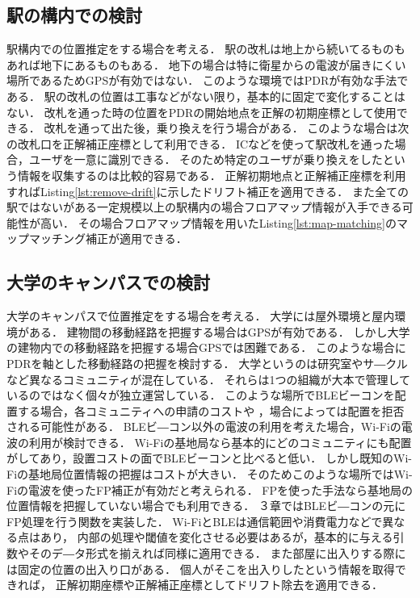 \subsection{駅の構内での検討}
駅構内での位置推定をする場合を考える．
駅の改札は地上から続いてるものもあれば地下にあるものもある．
地下の場合は特に衛星からの電波が届きにくい場所であるためGPSが有効ではない．
このような環境ではPDRが有効な手法である．
駅の改札の位置は工事などがない限り，基本的に固定で変化することはない．
改札を通った時の位置をPDRの開始地点を正解の初期座標として使用できる．
改札を通って出た後，乗り換えを行う場合がある．
このような場合は次の改札口を正解補正座標として利用できる．
ICなどを使って駅改札を通った場合，ユーザを一意に識別できる．
そのため特定のユーザが乗り換えをしたという情報を収集するのは比較的容易である．
正解初期地点と正解補正座標を利用すればListing\ref{lst:remove-drift}に示したドリフト補正を適用できる．
また全ての駅ではないがある一定規模以上の駅構内の場合フロアマップ情報が入手できる可能性が高い．
その場合フロアマップ情報を用いたListing\ref{lst:map-matching}のマップマッチング補正が適用できる．

\subsection{大学のキャンパスでの検討}
大学のキャンパスで位置推定をする場合を考える．
大学には屋外環境と屋内環境がある．
建物間の移動経路を把握する場合はGPSが有効である．
しかし大学の建物内での移動経路を把握する場合GPSでは困難である．
このような場合にPDRを軸とした移動経路の把握を検討する．
大学というのは研究室やサ―クルなど異なるコミュニティが混在している．
それらは1つの組織が大本で管理しているのではなく個々が独立運営している．
このような場所でBLEビーコンを配置する場合，各コミュニティへの申請のコストや
，場合によっては配置を拒否される可能性がある．
BLEビ―コン以外の電波の利用を考えた場合，Wi-Fiの電波の利用が検討できる．
Wi-Fiの基地局なら基本的にどのコミュニティにも配置がしてあり，設置コストの面でBLEビーコンと比べると低い．
しかし既知のWi-Fiの基地局位置情報の把握はコストが大きい．
そのためこのような場所ではWi-Fiの電波を使ったFP補正が有効だと考えられる．
FPを使った手法なら基地局の位置情報を把握していない場合でも利用できる．
３章ではBLEビ―コンの元にFP処理を行う関数を実装した．
Wi-FiとBLEは通信範囲や消費電力などで異なる点はあり，
内部の処理や閾値を変化させる必要はあるが，基本的に与える引数やそのデ―タ形式を揃えれば同様に適用できる．
また部屋に出入りする際には固定の位置の出入り口がある．
個人がそこを出入りしたという情報を取得できれば，
正解初期座標や正解補正座標としてドリフト除去を適用できる．
